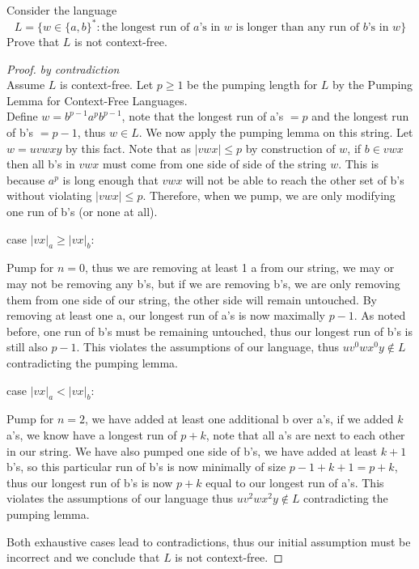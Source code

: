 \documentclass[12pt]{jhwhw}
\begin{document}
	Consider the language
	$$
	L = \{w \in \{a,b\}^* : \text{the longest run of $a$'s in $w$ is longer than any run of $b$'s in $w$}\}
	$$
	Prove that $L$ is not context-free.

\solution

	\begin{proof} \textit{by contradiction} \\
		Assume $L$ is context-free. 
		Let $p\geq 1$ be the pumping length for $L$ by the Pumping Lemma for Context-Free Languages. \\
		Define $w = b^{p-1}a^pb^{p-1}$, note that the longest run of a's $=p$ and the longest run of b's $=p-1$,
		thus $w\in L$. We now apply the pumping lemma on this string.
		Let $w=uvwxy$ by this fact.
		Note that as $|vwx|\leq p$ by construction of $w$, if $b\in vwx$ then all b's in $vwx$ must come
		from one side of side of the string $w$. This is because $a^p$ is long enough that $vwx$ will not
		be able to reach the other set of b's without violating $|vwx|\leq p$.
		Therefore, when we pump, we are only modifying one run of b's (or none at all).

		\bigbreak
		case $|vx|_a \geq |vx|_b$: \\
		\begin{addmargin}[1em]{}
			Pump for $n=0$, thus we are removing at least 1 a from our string, we may or may not be removing
			any b's, but if we are removing b's, we are only removing them from one side of our string, the
			other side will remain untouched. By removing at least one a, our longest run of a's is now maximally
			$p-1$. As noted before, one run of b's must be remaining untouched, thus our longest run of b's is
			still also $p-1$. This violates the assumptions of our language, thus 
			$uv^0wx^0y \not\in L$ contradicting the pumping lemma.
		\end{addmargin}
		case $|vx|_a < |vx|_b$: \\
		\begin{addmargin}[1em]{}
			Pump for $n=2$, we have added at least one additional b over a's, if we added $k$ a's,
			we know have a longest run of $p+k$, note that all a's are next to each other in our string.
			We have also pumped one side of b's, we have added at least $k+1$ b's, so this particular run
			of b's is now minimally of size $p-1+k+1=p+k$, thus our longest run of b's is now $p+k$ equal to our
			longest run of a's. This violates the assumptions of our language thus 
			$uv^2wx^2y \not\in L$ contradicting the pumping lemma.
		\end{addmargin}

		Both exhaustive cases lead to contradictions, thus our initial assumption must be incorrect and
		we conclude that $L$ is not context-free.
		
	\end{proof}
\end{document}
